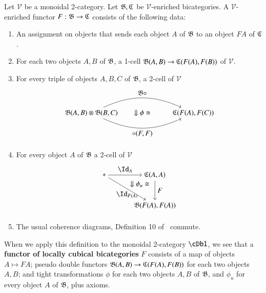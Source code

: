 {\begin{defn}\label{def:lcbcfunc}
Let $\mathcal{V}$ be a monoidal 2-category. Let ${\mathfrak{B},\mathfrak{C}}$ be $\mathcal{V}$-enriched bicategories. A $\mathcal{V}$-enriched functor $F: {\mathfrak{B}} \rightarrow {\ensuremath{\mathfrak{C}}}$ consists of the following data:
\begin{enumerate}
\item An assignment on objects that sends each object $A$ of ${\mathfrak{B}}$ to an object $F A$ of ${\mathfrak{C}}$.
\item For each two objects $A,B$ of ${\mathfrak{B}}$, a 1-cell ${\mathfrak{B}}(A,B) \rightarrow {\ensuremath{\mathfrak{C}}}(F(A),F(B))$ of $\mathcal{V}$.
\item For every triple of objects $A,B,C$ of ${\mathfrak{B}}$, a 2-cell of $\mathcal{V}$ 
\begin{align} 
\begin{tikzpicture}
\node(1) at (0,0) {${\fB}(A,B) \otimes {\fB}(B,C)$};
\node(2) at (5,0) {${\fC}(F(A),F(C))$};
\draw[->] (1) to[in=155, out=25] node[above]{$\fB \comp $} (2); 
\draw[->] (1) to[in=-155, out=-25] node[below]{$ \comp (F,F)$} (2); 
\node at (2.5,0) {$\Downarrow \phi \iso$};
\end{tikzpicture}
\end{align}
\item For every object $A$ of ${\mathfrak{B}}$ a 2-cell of $\mathcal{V}$
\begin{align}
\begin{tikzpicture}[xscale=.5, yscale=.3]
\node(1) at (0,0) {$*$};
\node(2) at (5,0) {${\fC}(A,A)$};
\node(3) at (5,-5) {${\fB}(F(A),F(A))$};
\draw[->] (1) to node[above]{$\looseid_{A}$} (2); 
\draw[->] (1) to node[below]{$\looseid_{F(A)}$} (3);
\draw[->] (2) to node[right]{$F$} (3); 
\node at (3.5,-1.5) {$\Downarrow \phi_u \iso$};
\end{tikzpicture}
\end{align}
\item The usual coherence diagrams, Definition 10 of~\cite{nick:tricatsbook} commute.
\end{enumerate}
\end{defn}

When we apply this definition to the monoidal 2-category $\cDbl$, we see that a {\bf functor of locally cubical bicategories} $F$ consists of a map of objects $A \mapsto F A$; pseudo double functors ${\mathfrak{B}}(A,B) \rightarrow {\ensuremath{\mathfrak{C}}}(F(A),F(B))$ for each two objects $A,B$; and tight transformations $\phi$ for each two objects $A,B$ of ${\mathfrak{B}}$, and $\phi_u$ for every object $A$ of ${\mathfrak{B}}$, plus axioms.

}
